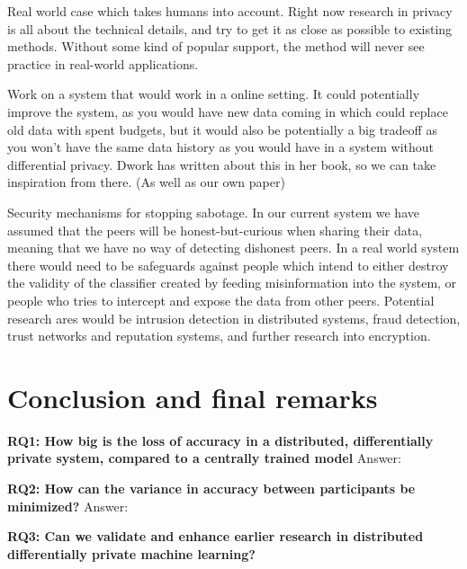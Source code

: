 Real world case which takes humans into account. Right now research in privacy is all about the technical details, and try to get it as close as possible to existing methods. Without some kind of popular support, the method will never see practice in real-world applications. 

Work on a system that would work in a online setting. It could potentially improve the system, as you would have new data coming in which could replace old data with spent budgets, but it would also be potentially a big tradeoff as you won't have the same data history as you would have in a system without differential privacy. Dwork has written about this in her book, so we can take inspiration from there. (As well as our own paper)

Security mechanisms for stopping sabotage. In our current system we have assumed that the peers will be honest-but-curious when sharing their data, meaning that we have no way of detecting dishonest peers. In a real world system there would need to be safeguards against people which intend to either destroy the validity of the classifier created by feeding misinformation into the system, or people who tries to intercept and expose the data from other peers. Potential research ares would be intrusion detection in distributed systems, fraud detection, trust networks and reputation systems, and further research into encryption.  


\section{Conclusion and final remarks}
\textbf{RQ1: How big is the loss of accuracy in a distributed, differentially private system, compared to a centrally trained model}
Answer:

\vspace{2mm}
\noindent
\textbf{RQ2: How can the variance in accuracy between participants be minimized?}
Answer:

\vspace{2mm}
\noindent
\textbf{RQ3: Can we validate and enhance earlier research in distributed differentially private machine learning?}

\newpage
\listoftodos[Notes]

\cleardoublepage